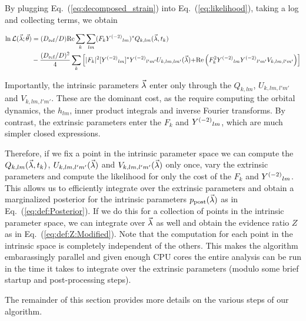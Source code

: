 By plugging Eq.~(\ref{eq:decomposed_strain}) into Eq.~(\ref{eq:likelihood}), taking a log and collecting terms, we obtain
\begin{widetext}
\begin{align}
\ln {\cal L}(\vec{\lambda}; \vec{\theta}) 
&= (D_{\rm ref}/D) \text{Re} \sum_k \sum_{lm}(F_k Y^{(-2)}{}_{lm})^* Q_{k,lm}(\vec{\lambda},t_k)\nonumber \\
&   -\frac{(D_{\rm ref}/D)^2}{4}\sum_k
\left[
{
|F_k|^2 [Y^{(-2)}{}_{lm}]^*Y^{(-2)}{}_{l'm'} U_{k,lm,lm'}(\vec{\lambda})
}
 {
+  \text{Re} \left( F_k^2 Y^{(-2)}{}_{lm} Y^{(-2)}{}_{l'm'} V_{k,lm,l'm'} \right)
}
\right]
\label{eq:def:lnL:Decomposed}
\end{align}
\end{widetext}
Importantly, the intrinsic parameters $\vec{\lambda}$ enter only through the $Q_{k,lm}$, $U_{k,lm,l'm'}$ and $V_{k,lm,l'm'}$.
These are the dominant cost, as the require computing the orbital dynamics, the $h_{lm}$, inner product integrals
and inverse Fourier transforms. By contrast, the extrinsic parameters enter the $F_k$ and $Y^{(-2)}{}_{lm}$,
which are much simpler closed expressions.

Therefore, if we fix a point in the intrinsic parameter space we can compute the
$Q_{k,lm}(\vec{\lambda},t_k)$, $U_{k,lm,l'm'}(\vec{\lambda})$ and $V_{k,lm,l'm'}(\vec{\lambda})$ only once,
vary the extrinsic parameters and compute the likelihood for only the cost of the $F_k$ and $Y^{(-2)}{}_{lm}$.
This allows us to efficiently integrate over the extrinsic parameters and obtain a marginalized posterior 
for the intrinsic parameters $p_{\rm post}(\vec{\lambda})$ as in Eq.~(\ref{eq:def:Posterior}).
If we do this for a collection of points in the intrinsic parameter space, we can integrate over $\vec{\lambda}$ as
well and obtain the evidence ratio $Z$ as in Eq.~(\ref{eq:def:Z:Modified}).
Note that the computation for each point in the intrinsic space is completely independent of the others.
This makes the algorithm embarassingly parallel and given enough CPU cores the entire analysis can be
run in the time it takes to integrate over the extrinsic parameters (modulo some brief startup and post-processing steps).

The remainder of this section provides more details on the various steps of our algorithm.


